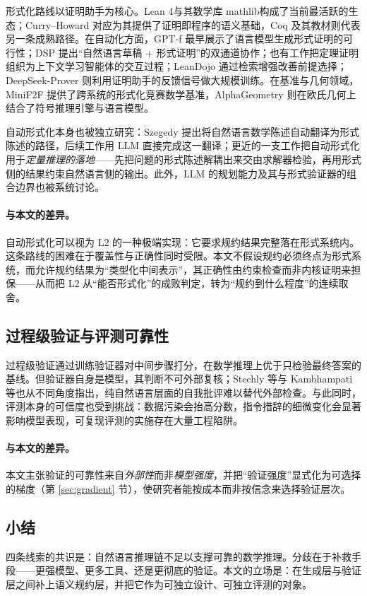 形式化路线以证明助手为核心。Lean 4\citep{moura2021lean}与其数学库 mathlib\citep{mathlib2020lean}构成了当前最活跃的生态；Curry--Howard 对应为其提供了证明即程序的语义基础\citep{wadler2015propositions}，Coq 及其教材则代表另一条成熟路径\citep{bertot2004interactive}。在自动化方面，GPT-f 最早展示了语言模型生成形式证明的可行性\citep{polu2020generative}；DSP 提出“自然语言草稿 + 形式证明”的双通道协作\citep{jiang2022draft}；也有工作把定理证明组织为上下文学习智能体的交互过程\citep{thakur2023context}；LeanDojo 通过检索增强改善前提选择\citep{yang2023leandojo}；DeepSeek-Prover 则利用证明助手的反馈信号做大规模训练\citep{xin2024deepseek}。在基准与几何领域，MiniF2F 提供了跨系统的形式化竞赛数学基准\citep{zheng2021minif}，AlphaGeometry 则在欧氏几何上结合了符号推理引擎与语言模型\citep{trinh2024solving}。

自动形式化本身也被独立研究：Szegedy 提出将自然语言数学陈述自动翻译为形式陈述的路径\citep{szegedy2020promising}，后续工作用 LLM 直接完成这一翻译\citep{wu2022autoformalization}；更近的一支工作把自动形式化用于\emph{定量推理的落地}——先把问题的形式陈述解耦出来交由求解器检验，再用形式侧的结果约束自然语言侧的输出\citep{zhou2024don}。此外，LLM 的规划能力及其与形式验证器的组合边界也被系统讨论\citep{kambhampati2024llms}。

\paragraph{与本文的差异。}自动形式化可以视为 L2 的一种极端实现：它要求规约结果完整落在形式系统内。这条路线的困难在于覆盖性与正确性同时受限。本文不假设规约必须终点为形式系统，而允许规约结果为“类型化中间表示”，其正确性由约束检查而非内核证明来担保——从而把 L2 从“能否形式化”的成败判定，转为“规约到什么程度”的连续取舍。

\subsection{过程级验证与评测可靠性}

过程级验证通过训练验证器对中间步骤打分\citep{lightman2023let,uesato2022solving}，在数学推理上优于只检验最终答案的基线。但验证器自身是模型，其判断不可外部复核；Stechly 等与 Kambhampati 等也从不同角度指出，纯自然语言层面的自我批评难以替代外部检查\citep{stechly2023gpt,kambhampati2024llms}。与此同时，评测本身的可信度也受到挑战：数据污染会抬高分数\citep{sainz2023nlp}，指令措辞的细微变化会显著影响模型表现\citep{ni2023evaluating}，可复现评测的实施存在大量工程陷阱\citep{biderman2024lessons}。

\paragraph{与本文的差异。}本文主张验证的可靠性来自\emph{外部性}而非\emph{模型强度}，并把“验证强度”显式化为可选择的梯度（第 \ref{sec:gradient} 节），使研究者能按成本而非按信念来选择验证层次。

\subsection{小结}

四条线索的共识是：自然语言推理链不足以支撑可靠的数学推理。分歧在于补救手段——更强模型、更多工具、还是更彻底的验证。本文的立场是：在生成层与验证层之间补上语义规约层，并把它作为可独立设计、可独立评测的对象。
